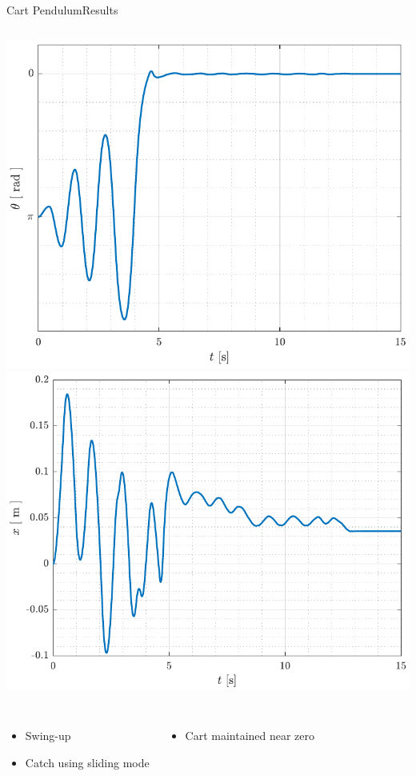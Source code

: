\begin{frame}{Cart Pendulum}{Results}
  \begin{columns}[c]
      \includegraphics[width=.99\textwidth]{figures/theta_swingNslide}
      \includegraphics[width=1.031\textwidth]{figures/x_swingNslide}
      \vspace{-10pt}
  \end{columns}
  \begin{columns}[c]
    \begin{itemize}
      \item Swing-up
      \item Catch using sliding mode
    \end{itemize}
    \begin{itemize}\centering
      \item Cart maintained near zero
    \end{itemize}
  \end{columns}
\end{frame}

